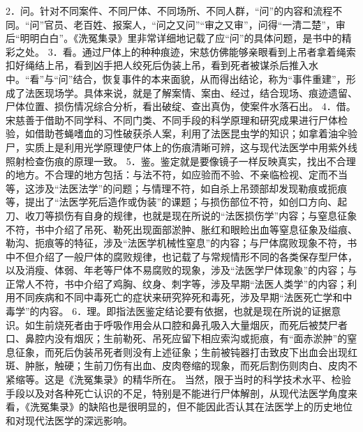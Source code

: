 \documentclass[12pt,UTF8]{ctexbook}
\begin{document}
2．问。针对不同案件、不同尸体、不同场所、不同人群，“问”的内容和流程不同。“问”官员、老百姓、报案人，“问之又问”“审之又审”，问得“一清二楚”，审后“明明白白”。《洗冤集录》里非常详细地记载了应“问”的具体问题，是书中的精彩之处。
3．看。通过尸体上的种种痕迹，宋慈仿佛能够亲眼看到上吊者拿着绳索扣好绳结上吊，看到凶手把人绞死后伪装上吊，看到死者被谋杀后推入水中。“看”与“问”结合，恢复事件的本来面貌，从而得出结论，称为“事件重建”，形成了法医现场学。具体来说，就是了解案情、案由、经过，结合现场、痕迹遗留、尸体位置、损伤情况综合分析，看出破绽、查出真伪，使案件水落石出。
4．借。宋慈善于借助不同学科、不同门类、不同手段的科学原理和研究成果进行尸体检验，如借助苍蝇嗜血的习性破获杀人案，利用了法医昆虫学的知识；如拿着油伞验尸，实质上是利用光学原理使尸体上的伤痕清晰可辨，这与现代法医学中用紫外线照射检查伤痕的原理一致。
5．鉴。鉴定就是要像镜子一样反映真实，找出不合理的地方。不合理的地方包括：与法不符，如应验而不验、不亲临检视、定而不当等，这涉及“法医法学”的问题；与情理不符，如自杀上吊颈部却发现勒痕或扼痕等，提出了“法医学死后造作或伪装”的课题；与损伤部位不符，如创口方向、起刀、收刀等损伤有自身的规律，也就是现在所说的“法医损伤学”内容；与窒息征象不符，书中介绍了吊死、勒死出现面部淤肿、胀红和眼睑出血等窒息征象及缢痕、勒沟、扼痕等的特征，涉及“法医学机械性窒息”的内容；与尸体腐败现象不符，书中不但介绍了一般尸体的腐败规律，也记载了与常规情形不同的各类保存型尸体，以及消瘦、体弱、年老等尸体不易腐败的现象，涉及“法医学尸体现象”的内容；与正常人不符，书中介绍了鸡胸、纹身、刺字等，涉及早期“法医人类学”的内容；利用不同疾病和不同中毒死亡的症状来研究猝死和毒死，涉及早期“法医死亡学和中毒学”的内容。
6．理。即指法医鉴定结论要有依据，也就是现在所说的证据意识。如生前烧死者由于呼吸作用会从口腔和鼻孔吸入大量烟灰，而死后被焚尸者口、鼻腔内没有烟灰；生前勒死、吊死应留下相应索沟或扼痕，有“面赤淤肿”的窒息征象，而死后伪装吊死者则没有上述征象；生前被钝器打击致皮下出血会出现红斑、肿胀，触硬；生前刀伤有出血、皮肉卷缩的现象，而死后割伤则肉白、皮肉不紧缩等。这是《洗冤集录》的精华所在。
当然，限于当时的科学技术水平、检验手段以及对各种死亡认识的不足，特别是不能进行尸体解剖，从现代法医学角度来看，《洗冤集录》的缺陷也是很明显的，但不能因此否认其在法医学上的历史地位和对现代法医学的深远影响。
\end{document}
